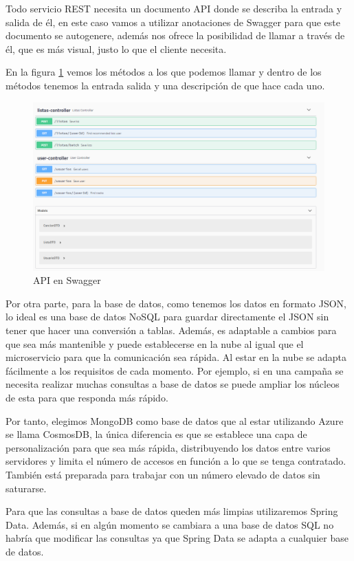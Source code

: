 \documentclass[12pt]{report} %
\begin{document}
Todo servicio REST necesita un documento API donde se describa la entrada y salida de él, en este caso vamos a utilizar anotaciones de Swagger para que este documento se autogenere, además nos ofrece la posibilidad de llamar a través de él, que es más visual, justo lo que el cliente necesita.

En la figura \ref{fig:capturaswagger} vemos los métodos a los que podemos llamar y dentro de los métodos tenemos la entrada salida y una descripción de que hace cada uno.
\begin{figure}
	\centering
	\includegraphics[width=0.7\linewidth]{imagenes/CapturaSwagger}
	\caption{API en Swagger}
	\label{fig:capturaswagger}
\end{figure}


Por otra parte, para la base de datos, como tenemos los datos en formato JSON, lo ideal es una base de datos NoSQL para guardar directamente el JSON sin tener que hacer una conversión a tablas. Además, es adaptable a cambios para que sea más mantenible y puede establecerse en la nube al igual que el microservicio para que la comunicación sea rápida. Al estar en la nube se adapta fácilmente a los requisitos de cada momento. Por ejemplo, si en una campaña se necesita realizar muchas consultas a base de datos se puede ampliar los núcleos de esta para que responda más rápido.

Por tanto, elegimos MongoDB como base de datos que al estar utilizando Azure se llama CosmosDB, la única diferencia es que se establece una capa de personalización para que sea más rápida, distribuyendo los datos entre varios servidores y limita el número de accesos en función a lo que se tenga contratado. También está preparada para trabajar con un número elevado de datos sin saturarse.

Para que las consultas a base de datos queden más limpias utilizaremos Spring Data. Además, si en algún momento se cambiara a una base de datos SQL no habría que modificar las consultas ya que Spring Data se adapta a cualquier base de datos.
\end{document}
